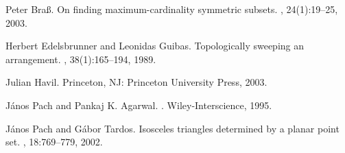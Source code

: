 \documentclass{article}
\begin{document}

\begin{thebibliography}{1}

Peter Bra{\ss}.
\newblock On finding maximum-cardinality symmetric subsets.
, 24(1):19--25,
  2003.

Herbert Edelsbrunner and Leonidas Guibas.
\newblock Topologically sweeping an arrangement.
, 38(1):165--194, 1989.

Julian Havil.
\newblock Princeton, NJ: Princeton University Press, 2003.

J\'{a}nos Pach and Pankaj K. Agarwal.
.
\newblock Wiley-Interscience, 1995.

J\'{a}nos Pach and G\'{a}bor Tardos.
\newblock Isosceles triangles determined by a planar point set.
, 18:769--779, 2002.

\end{thebibliography}
\begin{comment}
@article{64321,
 author = {Edelsbrunner, Herbert and Guibas, Leonidas},
 title = {Topologically sweeping an arrangement},
 journal = {J. Comput. Syst. Sci.},
 volume = {38},
 number = {1},
 year = {1989},
 issn = {0022-0000},
 pages = {165--194},
 doi = {http://dx.doi.org/10.1016/0022-0000(89)90038-X},
 publisher = {Academic Press, Inc.},
 address = {Orlando, FL, USA},
 }
 \end{comment}
\end{document}
